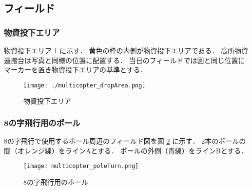 \subsection{フィールド}
\subsubsection{物資投下エリア}
物資投下エリア \ref{fig::multicopter::dropArea} に示す．
黄色の枠の内側が物資投下エリアである．
高所物資運搬台は写真と同様の位置に配置する．
当日のフィールドでは図と同じ位置にマーカーを置き物資投下エリアの基準とする．
\begin{figure}[ht]
  \centering\texttt{[image: ./multicopter\_dropArea.png]}
  \caption{物資投下エリア}
  \label{fig::multicopter::dropArea}
\end{figure}

\newpage
\subsubsection{8の字飛行用のポール}
8の字飛行で使用するポール周辺のフィールド図を図 \ref{fig::multicopter::poleTurn} に示す．
2本のポールの間（オレンジ線）をラインAとする．
ポールの外側（青線）をラインBとする．
\begin{figure}[h]
  \centering\texttt{[image: multicopter\_poleTurn.png]}
  \caption{8の字飛行用のポール}
  \label{fig::multicopter::poleTurn}
\end{figure}